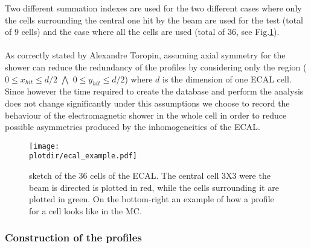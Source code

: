 Two different summation indexes are used for the two different cases
where only the cells surrounding the central one hit by the beam are
used for the test (total of 9 cells) and the case where all the cells
are used (total of 36, see Fig.\ref{fig:ecal_example}).
\\
\\
As correctly stated by Alexandre Toropin, assuming axial symmetry for
the shower can reduce the redundancy of the profiles by considering
only the region ($0 \leq x_{hit} \leq d/2$ $\bigwedge$
$0 \leq y_{hit} \leq d/2$) where $d$ is the dimension of one ECAL
cell. Since however the time required to create the database and
perform the analysis does not change significantly under this
assumptions we choose to record the behaviour of the electromagnetic
shower in the whole cell in order to reduce possible asymmetries
produced by the inhomogeneities of the ECAL.

\begin{figure}[h!]
  \begin{center}
    \texttt{[image: \\plotdir/ecal\_example.pdf]}
  \end{center}
  \caption{sketch of the 36 cells of the ECAL. The central cell 3X3
    were the beam is directed is plotted in red, while the cells
    surrounding it are plotted in green. On the bottom-right an
    example of how a profile for a cell looks like in the MC.}
  \label{fig:ecal_example}
\end{figure}


 
\subsubsection{Construction of the profiles}
\label{chapter3:sec:make_profile}


